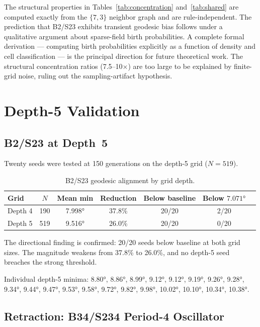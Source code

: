 \documentclass[12pt,a4paper]{article}
\begin{document}
The structural properties in Tables~\ref{tab:concentration} and~\ref{tab:shared} are computed exactly from the $\{7,3\}$ neighbor graph and are rule-independent. The prediction that B2/S23 exhibits transient geodesic bias follows under a qualitative argument about sparse-field birth probabilities. A complete formal derivation --- computing birth probabilities explicitly as a function of density and cell classification --- is the principal direction for future theoretical work. The structural concentration ratios (7.5--10$\times$) are too large to be explained by finite-grid noise, ruling out the sampling-artifact hypothesis.

\section{Depth-5 Validation}
\label{sec:validation}

\subsection{B2/S23 at Depth~5}

Twenty seeds were tested at 150 generations on the depth-5 grid ($N=519$).

\begin{table}[h]
\centering
\caption{B2/S23 geodesic alignment by grid depth.}
\label{tab:scales}
\begin{tabular}{lcccccc}
\toprule
Grid & $N$ & Mean min & Reduction & Below baseline & Below $7.071°$ \\
\midrule
Depth 4 & 190 & 7.998° & 37.8\% & 20/20 & 2/20 \\
Depth 5 & 519 & 9.516° & 26.0\% & 20/20 & 0/20 \\
\bottomrule
\end{tabular}
\end{table}

The directional finding is confirmed: 20/20 seeds below baseline at both grid sizes. The magnitude weakens from 37.8\% to 26.0\%, and no depth-5 seed breaches the strong threshold.

Individual depth-5 minima: 8.80°, 8.86°, 8.99°, 9.12°, 9.12°, 9.19°, 9.26°, 9.28°, 9.34°, 9.44°, 9.47°, 9.53°, 9.58°, 9.72°, 9.82°, 9.98°, 10.02°, 10.10°, 10.34°, 10.38°.

\subsection{Retraction: B34/S234 Period-4 Oscillator}
\label{sec:retraction}
\end{document}
